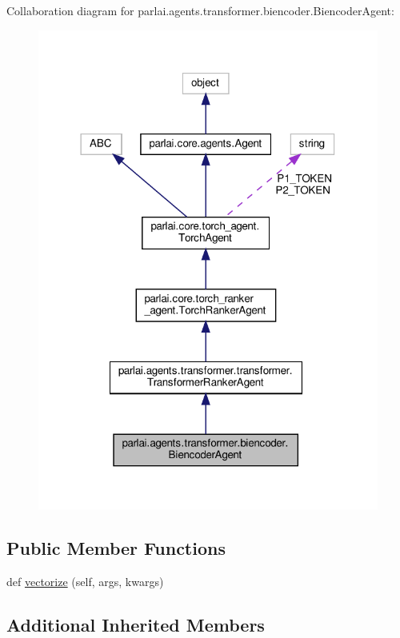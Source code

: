 Collaboration diagram for parlai.\+agents.\+transformer.\+biencoder.\+Biencoder\+Agent\+:
\nopagebreak
\begin{figure}[H]
\begin{center}
\leavevmode
\includegraphics[width=318pt]{classparlai_1_1agents_1_1transformer_1_1biencoder_1_1BiencoderAgent__coll__graph}
\end{center}
\end{figure}
\subsection*{Public Member Functions}
\begin{DoxyCompactItemize}
\item 
def \hyperlink{classparlai_1_1agents_1_1transformer_1_1biencoder_1_1BiencoderAgent_a0a75b68e9e6877358245f85bcb438d03}{vectorize} (self, args, kwargs)
\end{DoxyCompactItemize}
\subsection*{Additional Inherited Members}


